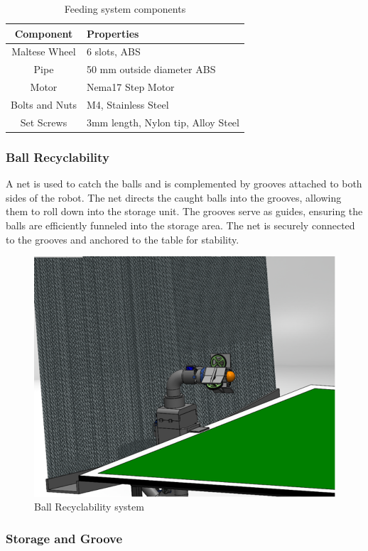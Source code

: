 \documentclass[12pt]{article}
\begin{document}
\begin{table}[h!]
\scriptsize
\centering
\caption{Feeding system components}
\begin{tabular}{|c|p{6cm}|}
\hline
\textbf{Component} & \textbf{Properties} \\ \hline
Maltese Wheel & 6 slots, ABS \\ \hline
Pipe & 50 mm outside diameter ABS \\ \hline
Motor & Nema17 Step Motor \\ \hline
Bolts and Nuts & M4, Stainless Steel \\ \hline
Set Screws & 3mm length, Nylon tip, Alloy Steel \\ \hline
\end{tabular}
\label{table:feeding_components}
\end{table}


\subsubsection{Ball Recyclability}

A net is used to catch the balls and is complemented by grooves attached to both sides of the robot. The net directs the caught balls into the grooves, allowing them to roll down into the storage unit. The grooves serve as guides, ensuring the balls are efficiently funneled into the storage area. The net is securely connected to the grooves and anchored to the table for stability.

\begin{figure}[h!]
    \centering
    \includegraphics[width=0.5\linewidth]{2.3.5.1.png}
    \caption{Ball Recyclability system}
    \label{fig:enter-label}
\end{figure}

\subsubsection{Storage and Groove}
\end{document}

